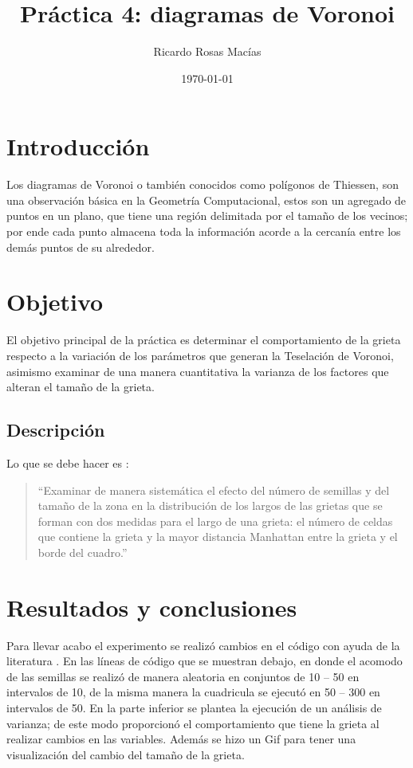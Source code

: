 \documentclass[12pt, letterpaper] {article}
\author{Ricardo Rosas Macías}
\title{Práctica 4: diagramas de Voronoi}
\date{\today}
\begin{document}
\maketitle



\section{Introducción}

Los diagramas de Voronoi \cite{articlevoronoi} o también conocidos como polígonos de Thiessen, son una observación básica en la Geometría Computacional, estos son un agregado de puntos en un plano, que tiene una región delimitada por el tamaño de los vecinos; por ende cada punto almacena toda la información acorde a la cercanía entre los demás puntos de su alrededor.

 \section{Objetivo}

El objetivo principal de la práctica es determinar el comportamiento de la grieta respecto a la variación de los parámetros que generan la Teselación de Voronoi, asimismo examinar de una manera cuantitativa la varianza de los factores que alteran el tamaño de la grieta.

 \subsection{Descripción}

Lo que se debe hacer es \cite{elisawebDV}:
\begin{quotation}
 ``Examinar de manera sistemática el efecto del número de semillas y del tamaño de la zona en la distribución de los largos de las grietas que se forman con dos medidas para el largo de una grieta: el número de celdas que contiene la grieta y la mayor distancia Manhattan entre la grieta y el borde del cuadro.''
\end{quotation}

\section{Resultados y conclusiones}

Para llevar acabo el experimento se realizó cambios en el código \cite{EMP4} con ayuda de la literatura \cite{P4As}. En las líneas de código que se muestran debajo, en donde el acomodo de las semillas se realizó de manera aleatoria en conjuntos de 10 -- 50 en intervalos de 10, de la misma manera la cuadricula se ejecutó en 50 -- 300 en intervalos de 50. En la parte inferior se plantea la ejecución de un análisis de varianza; de este modo proporcionó el comportamiento que tiene la grieta al realizar cambios en las variables. Además se hizo un Gif para tener una visualización del cambio del tamaño de la grieta.
\end{document}
